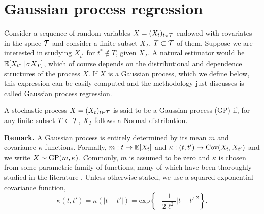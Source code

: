 

\section{Gaussian process regression} \label{section:GPs}


Consider a sequence of random variables $X = (X_t)_{t \in \mathcal{T}}$ endowed with covariates in the space $\mathcal{T}$ and consider a finite subset $X_T$, $T \subset \mathcal{T}$ of them. Suppose we are interested in studying $X_{t^{*}}$ for $t^{*} \notin T$, given $X_T$. A natural estimator would be $\mathbb{E} [X_{t^{*}} \, | \, \sigma X_T ]$, which of course depends on the distributional and dependence structures of the process $X$. If $X$ is a Gaussian process, which we define below, this expression can be easily computed and the methodology just discusses is called Gaussian process regression.



\begin{definition} \label{def:GP}
	A stochastic process $X = (X_t)_{t \in \mathcal{T}}$ is said to be a Gaussian process (GP) if, for any finite subset $T \subset \mathcal{T}$, $X_T$ follows a Normal distribution. 
\end{definition}


\textbf{Remark.} A Gaussian process is entirely determined by its mean $m$ and covariance $\kappa$ functions. Formally, $m: t \mapsto \mathbb{E}[X_t]$ and $\kappa: (t, t') \mapsto \mathrm{Cov}(X_t, X_{t'})$ and we write $X \sim \mathrm{GP} (m, \kappa)$. Commonly, $m$ is assumed to be zero and $\kappa$ is chosen from some parametric family of functions, many of which have been thoroughly studied in the literature \cite[see][Ch.~4]{RasmussenWilliams:2006}. Unless otherwise stated, we use a squared exponential covariance function,
\begin{equation} \label{eq:sq_exp_cov}
	\kappa(t, t') = \kappa(|t-t'|) = \mathrm{exp} \left\{ -\frac{1}{2 \ell^2} |t-t'|^2 \right\}.
\end{equation}



